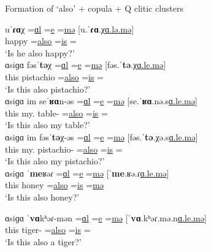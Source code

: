 \begin{exe}
	\ex Formation of `also' + copula  + Q  clitic clusters \label{example:stress:cliticCluster:also cop q}
	\begin{xlist}
		\ex \gll uˈ\textbf{ɾɑ}χ =\underline{ɑl} =\underline{e}  =\underline{mə} [u.ˈ\textbf{ɾɑ}.χ\underline{ɑ.lə.mə}]
		\\
		happy =\underline{also} =\underline{is} =\underline{{\q}}
		\\
		\trans `Is he also happy?'
		\\
		\ex \gll ɑsiɡɑ fəsˈ\textbf{tə}χ =\underline{ɑl} =\underline{e} =\underline{mə} [fəs.ˈ\textbf{tə}.χ\underline{ɑ.le.mə}]
		\\
		this pistachio  =\underline{also}  =\underline{is} =\underline{{\q}}
		\\
		\trans `Is this  also pistachio?'
		\\
		\ex \gll ɑsiɡɑ im seˈ\textbf{ʁɑ}n-əs =\underline{ɑl}   =\underline{e} =\underline{mə} [se.ˈ\textbf{ʁɑ}.nə.s\underline{ɑ.le.mə}]
		\\
		this my.{\gen} table-{\possFsg} =\underline{also}  =\underline{is} =\underline{{\q}} 
		\\
		\trans `Is this also my table?'
		\\
		\ex \gll ɑsiɡɑ im fəsˈ\textbf{tə}χ-əs =\underline{ɑl} =\underline{e} =\underline{mə} [fəs.ˈ\textbf{tə}.χə.s\underline{ɑ.le.mə}]
		\\
		this my.{\gen} pistachio-{\possFsg}  =\underline{also}  =\underline{is} =\underline{{\q}}
		\\
		\trans `Is this   also my pistachio?'
		\\
		\ex \gll ɑsiɡɑ ˈ\textbf{me}ʁəɾ =\underline{ɑl} =\underline{e}  =\underline{mə} [ˈ\textbf{me}.ʁə.ɾ\underline{ɑ.le.mə}]
		\\
		this honey  =\underline{also} =\underline{is} =\underline{mə}
		\\
		\trans `Is this also honey?'
		\\
		
		\ex \gll ɑsiɡɑ ˈ\textbf{vɑ}kʰəɾ-mən =\underline{ɑl} =\underline{e}  =\underline{mə} [ˈ\textbf{vɑ}.kʰəɾ.mə.n\underline{ɑ.le.mə}]
		\\
		this tiger-{\indf}  =\underline{also} =\underline{is} =\underline{{\q}}
		\\
		\trans `Is this also a tiger?'
		\\
	\end{xlist}
\end{exe}

